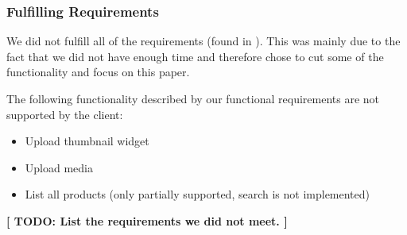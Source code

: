 \subsubsection{Fulfilling Requirements}
We did not fulfill all of the requirements (found in  ). This was mainly due to the fact that we did not have enough time and therefore chose to cut some of the functionality and focus on this paper.

The following functionality described by our functional requirements are not supported by the client:
\begin{itemize}
	\item Upload thumbnail widget
	\item Upload media
	\item List all products (only partially supported, search is not implemented)
\end{itemize}

\textbf{[ TODO: List the requirements we did not meet. ]}